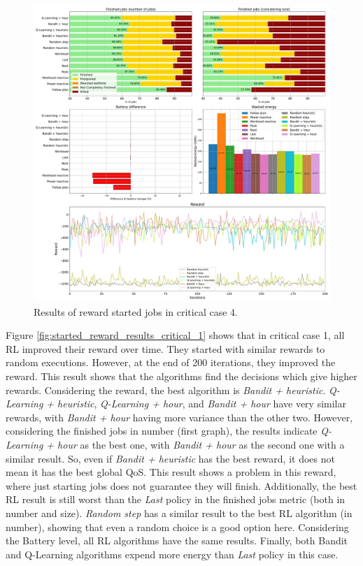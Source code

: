 \begin{figure}[!htb]
    \centering
    \includegraphics[scale=0.29]{Images/Learning_compensations/reward_started_profile_worst_workload_2_with_noise_state_delta.pdf}
    \caption{Results of reward started jobs in critical case 4.}
    \label{fig:started_reward_results_critical_4}
\end{figure}

Figure \ref{fig:started_reward_results_critical_1} shows that in critical case 1, all RL improved their reward over time. They started with similar rewards to random executions. However, at the end of 200 iterations, they improved the reward. This result shows that the algorithms find the decisions which give higher rewards. Considering the reward, the best algorithm is \emph{Bandit + heuristic}. \emph{Q-Learning + heuristic}, \emph{Q-Learning + hour}, and \emph{Bandit + hour} have very similar rewards, with \emph{Bandit + hour} having more variance than the other two. However, considering the finished jobs in number (first graph), the results indicate \emph{Q-Learning + hour} as the best one, with \emph{Bandit + hour} as the second one with a similar result. So, even if \emph{Bandit + heuristic} has the best reward, it does not mean it has the best global QoS. This result shows a problem in this reward, where just starting jobs does not guarantee they will finish. Additionally, the best RL result is still worst than the \emph{Last} policy in the finished jobs metric (both in number and size). \emph{Random step} has a similar result to the best RL algorithm (in number), showing that even a random choice is a good option here. Considering the Battery level, all RL algorithms have the same results. Finally, both Bandit and Q-Learning algorithms expend more energy than \emph{Last} policy in this case.

